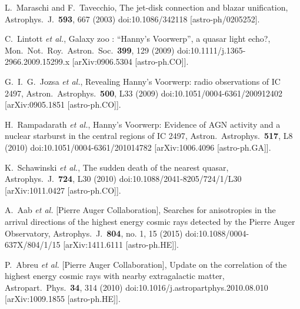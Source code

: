 \documentclass[aps,prd,twocolumn,superscriptaddress,tightenlines,nofootinbib]{revtex4-1}
\begin{document}
\begin{thebibliography}{99}
  L.~Maraschi and F.~Tavecchio,
   {\color{rossoCP3}  The jet-disk connection and blazar unification},
  Astrophys.\ J.\  {\bf 593}, 667 (2003)
  doi:10.1086/342118
  [astro-ph/0205252].



  C.~Lintott {\it et al.},
   {\color{rossoCP3}  Galaxy zoo : ``Hanny's Voorwerp'', a quasar light echo?},
  Mon.\ Not.\ Roy.\ Astron.\ Soc.\  {\bf 399}, 129 (2009)
  doi:10.1111/j.1365-2966.2009.15299.x
  [arXiv:0906.5304 [astro-ph.CO]].


  G.~I.~G.~Jozsa {\it et al.},
    {\color{rossoCP3}  Revealing Hanny's Voorwerp: radio observations of IC 2497},
  Astron.\ Astrophys.\  {\bf 500}, L33 (2009)
  doi:10.1051/0004-6361/200912402
  [arXiv:0905.1851 [astro-ph.CO]].


  H.~Rampadarath {\it et al.},
    {\color{rossoCP3} Hanny's Voorwerp: Evidence of AGN activity and a nuclear starburst in the central regions of IC 2497},
  Astron.\ Astrophys.\  {\bf 517}, L8 (2010)
  doi:10.1051/0004-6361/201014782
  [arXiv:1006.4096 [astro-ph.GA]].

  K.~Schawinski {\it et al.},
   {\color{rossoCP3}  The sudden death of the nearest quasar},
  Astrophys.\ J.\  {\bf 724}, L30 (2010)
  doi:10.1088/2041-8205/724/1/L30
  [arXiv:1011.0427 [astro-ph.CO]].

  A.~Aab {\it et al.} [Pierre Auger Collaboration],
     {\color{rossoCP3}  Searches for anisotropies in the arrival directions of the highest energy cosmic rays detected by the Pierre Auger Observatory},
  Astrophys.\ J.\  {\bf 804}, no. 1, 15 (2015)
  doi:10.1088/0004-637X/804/1/15
  [arXiv:1411.6111 [astro-ph.HE]].


  P.~Abreu {\it et al.} [Pierre Auger Collaboration],
     {\color{rossoCP3}  Update on the correlation of the highest energy cosmic rays with nearby extragalactic matter},
  Astropart.\ Phys.\  {\bf 34}, 314 (2010)
  doi:10.1016/j.astropartphys.2010.08.010
  [arXiv:1009.1855 [astro-ph.HE]].



\end{thebibliography}
\end{document}
